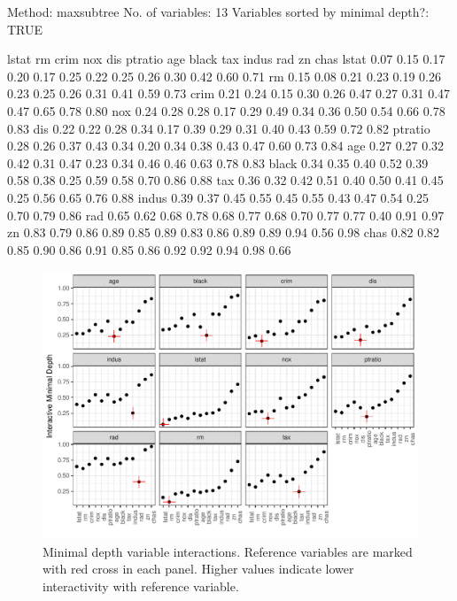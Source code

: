 \documentclass[article]{jss}
\begin{document}
\begin{CodeChunk}

\begin{CodeOutput}

                              Method: maxsubtree
                    No. of variables: 13
  Variables sorted by minimal depth?: TRUE

        lstat   rm crim  nox  dis ptratio  age black  tax indus  rad   zn chas
lstat    0.07 0.15 0.17 0.20 0.17    0.25 0.22  0.25 0.26  0.30 0.42 0.60 0.71
rm       0.15 0.08 0.21 0.23 0.19    0.26 0.23  0.25 0.26  0.31 0.41 0.59 0.73
crim     0.21 0.24 0.15 0.30 0.26    0.47 0.27  0.31 0.47  0.47 0.65 0.78 0.80
nox      0.24 0.28 0.28 0.17 0.29    0.49 0.34  0.36 0.50  0.54 0.66 0.78 0.83
dis      0.22 0.22 0.28 0.34 0.17    0.39 0.29  0.31 0.40  0.43 0.59 0.72 0.82
ptratio  0.28 0.26 0.37 0.43 0.34    0.20 0.34  0.38 0.43  0.47 0.60 0.73 0.84
age      0.27 0.27 0.32 0.42 0.31    0.47 0.23  0.34 0.46  0.46 0.63 0.78 0.83
black    0.34 0.35 0.40 0.52 0.39    0.58 0.38  0.25 0.59  0.58 0.70 0.86 0.88
tax      0.36 0.32 0.42 0.51 0.40    0.50 0.41  0.45 0.25  0.56 0.65 0.76 0.88
indus    0.39 0.37 0.45 0.55 0.45    0.55 0.43  0.47 0.54  0.25 0.70 0.79 0.86
rad      0.65 0.62 0.68 0.78 0.68    0.77 0.68  0.70 0.77  0.77 0.40 0.91 0.97
zn       0.83 0.79 0.86 0.89 0.85    0.89 0.83  0.86 0.89  0.89 0.94 0.56 0.98
chas     0.82 0.82 0.85 0.90 0.86    0.91 0.85  0.86 0.92  0.92 0.94 0.98 0.66
\end{CodeOutput}
\begin{figure}

{\centering \includegraphics{Regression-rfsrc_files/figure-latex/interactions-1} 

}

\caption[Minimal depth variable interactions]{Minimal depth variable interactions. Reference variables are marked with red cross in each panel. Higher values indicate lower interactivity with reference variable.}\label{fig:interactions}
\end{figure}
\end{CodeChunk}
\end{document}

